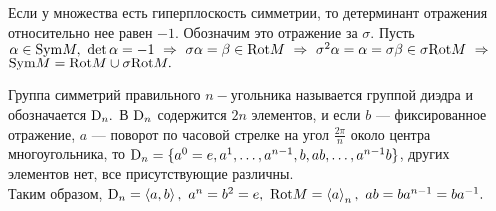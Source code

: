 Если у множества есть гиперплоскость симметрии, то детерминант отражения относительно нее равен $-1$. Обозначим это отражение за $\sigma.$
Пусть $\alpha\in\rr{Sym}M,\ \det\alpha=-1\ra\sigma\alpha=\beta\in\rr{Rot}M\ra\sigma^2\alpha=\alpha=\sigma\beta\in\sigma\rr{Rot}M\ra$
${\rm Sym}M={\rm Rot}M\cup\sigma{\rm Rot}M.$

Группа симметрий правильного $n-$угольника называется группой диэдра и обозначается ${\rm D}_n.$
В ${\rm D}_n$ содержится $2n$ элементов, и если $b$ --- фиксированное отражение, $a$ --- поворот по часовой стрелке на угол $\frac{2\pi}n$ около центра многоугольника, то
${\rm D}_n=\{a^0=e,a^1,\dots,a^{n-1},b,ab,\dots,a^{n-1}b\}$, других элементов нет, все присутствующие различны.\\ Таким образом,
$\rr D_n=\lob{a,b},\ a^n=b^2=e,\ \rr{Rot}M=\lob a_n,\ ab=ba^{n-1}=ba^{-1}.$
